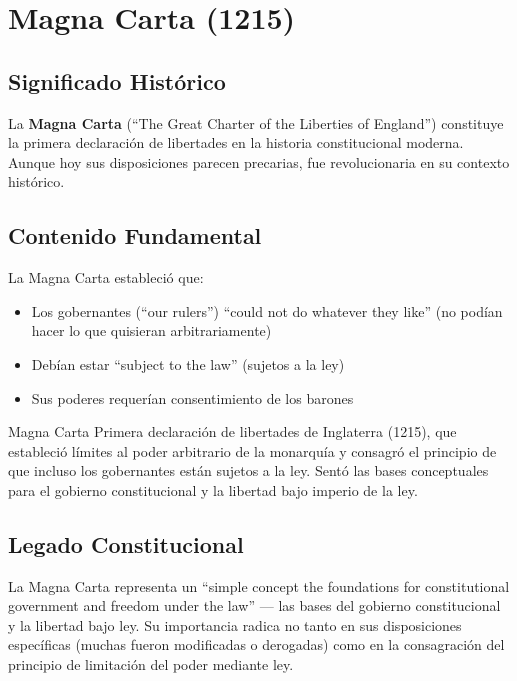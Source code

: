 \documentclass[12pt,oneside]{book}
\begin{document}
\section{Magna Carta (1215)}

\subsection{Significado Histórico}

La \textbf{Magna Carta} (``The Great Charter of the Liberties of England'') constituye la primera declaración de libertades en la historia constitucional moderna. Aunque hoy sus disposiciones parecen precarias, fue revolucionaria en su contexto histórico.

\subsection{Contenido Fundamental}

La Magna Carta estableció que:

\begin{itemize}
    \item Los gobernantes (``our rulers'') ``could not do whatever they like'' (no podían hacer lo que quisieran arbitrariamente)
    \item Debían estar ``subject to the law'' (sujetos a la ley)
    \item Sus poderes requerían consentimiento de los barones
\end{itemize}

\begin{definition}{Magna Carta}
Primera declaración de libertades de Inglaterra (1215), que estableció límites al poder arbitrario de la monarquía y consagró el principio de que incluso los gobernantes están sujetos a la ley. Sentó las bases conceptuales para el gobierno constitucional y la libertad bajo imperio de la ley.
\end{definition}

\subsection{Legado Constitucional}

La Magna Carta representa un ``simple concept the foundations for constitutional government and freedom under the law'' — las bases del gobierno constitucional y la libertad bajo ley. Su importancia radica no tanto en sus disposiciones específicas (muchas fueron modificadas o derogadas) como en la consagración del principio de limitación del poder mediante ley.
\end{document}
